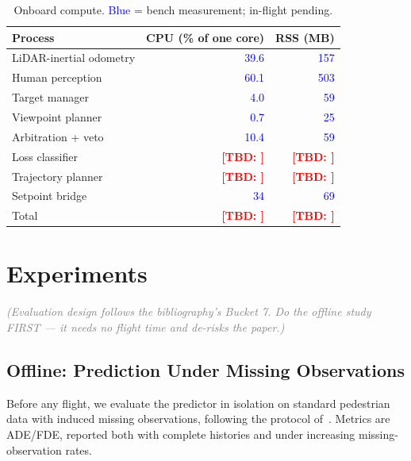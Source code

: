 \documentclass[conference]{IEEEtran}
\newcommand{\tbd}[1]{\textcolor{red}{\textbf{[TBD: #1]}}}
\newcommand{\bench}[1]{\textcolor{blue}{#1}}
\newcommand{\note}[1]{\textcolor{gray}{\textit{(#1)}}}
\begin{document}
\begin{table}[t]
\centering
\caption{Onboard compute. \bench{Blue} = bench measurement; in-flight pending.}
\label{tab:compute}
\footnotesize
\begin{tabular}{@{}lrr@{}}
\toprule
Process & CPU (\% of one core) & RSS (MB) \\
\midrule
LiDAR-inertial odometry   & \bench{39.6} & \bench{157} \\
Human perception          & \bench{60.1} & \bench{503} \\
Target manager            & \bench{4.0}  & \bench{59}  \\
Viewpoint planner         & \bench{0.7}  & \bench{25}  \\
Arbitration + veto        & \bench{10.4} & \bench{59}  \\
Loss classifier           & \tbd{}       & \tbd{}      \\
Trajectory planner        & \tbd{}       & \tbd{}      \\
Setpoint bridge           & \bench{34}   & \bench{69}  \\
\midrule
Total                     & \tbd{}       & \tbd{}      \\
\bottomrule
\end{tabular}
\end{table}

\section{Experiments}
\label{sec:results}

\note{Evaluation design follows the bibliography's Bucket 7. Do the offline
study FIRST --- it needs no flight time and de-risks the paper.}

\subsection{Offline: Prediction Under Missing Observations}
Before any flight, we evaluate the predictor in isolation on standard pedestrian
data with induced missing observations, following the protocol
of~\cite{chib2024trajimpute}. Metrics are ADE/FDE, reported both with complete
histories and under increasing missing-observation rates.
\end{document}

